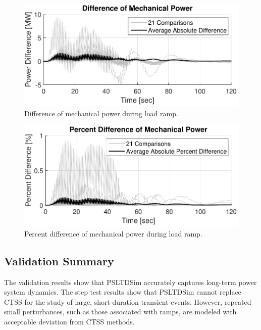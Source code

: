 \begin{figure}[!ht]
	\centering
	\includegraphics[width=\linewidth]{figures/miniWECC3ALTDrampPm2}
	\caption{Difference of mechanical power during load ramp.}
	\label{fig: rampPmdif}
\end{figure}

\begin{figure}[!ht]
	\centering
	\includegraphics[width=\linewidth]{figures/miniWECC3ALTDrampPm3}
	\caption{Percent difference of mechanical power during load ramp.}
	\label{fig: rampPmPercentdif}
\end{figure}
\subsection{Validation Summary}
The validation results show that PSLTDSim accurately captures long-term power system dynamics. 
The step test results show that PSLTDSim cannot replace CTSS for the study of large, short-duration transient events.
However, repeated small perturbances, such as those associated with ramps, are modeled with acceptable deviation from CTSS methods.